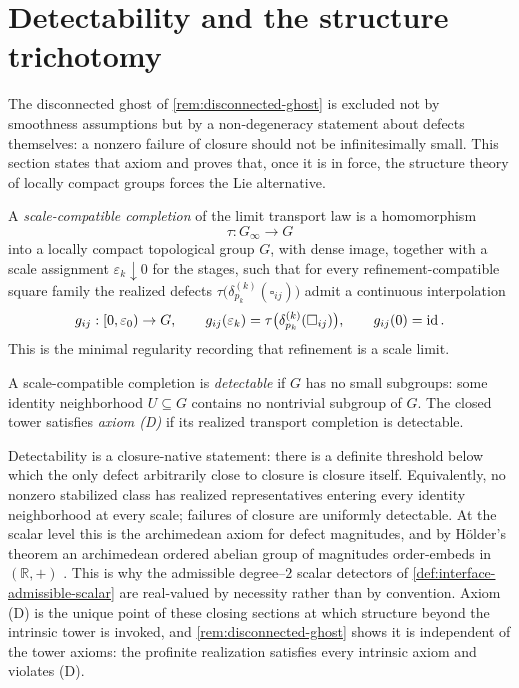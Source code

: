 \section{Detectability and the structure trichotomy}
\label{sec:interface-detectability}
The disconnected ghost of \cref{rem:disconnected-ghost} is excluded not
by smoothness assumptions but by a non-degeneracy statement about
defects themselves: a nonzero failure of closure should not be
infinitesimally small.  This section states that axiom and proves that,
once it is in force, the structure theory of locally compact groups
forces the Lie alternative.
\begin{definition}
	\label{def:scale-completion}
	A \emph{scale-compatible completion} of the limit transport law is a
	homomorphism
	\[
		\tau:G_\infty\to G
	\]
	into a locally compact topological group \(G\), with dense image,
	together with a scale assignment \(\varepsilon_k\downarrow 0\) for
	the stages, such that for every refinement-compatible square family
	the realized defects
	\(\tau\bigl(\delta_{p_k}^{(k)}(\square_{ij})\bigr)\) admit a
	continuous interpolation
	\[
		g_{ij}:[0,\varepsilon_0)\to G,
		\qquad
		g_{ij}(\varepsilon_k)=\tau\bigl(\delta_{p_k}^{(k)}(\square_{ij})\bigr),
		\qquad
		g_{ij}(0)=\operatorname{id} .
	\]
	This is the minimal regularity recording that refinement is a scale
	limit.
\end{definition}
\begin{definition}
	\label{def:axiom-D}
	A scale-compatible completion is \emph{detectable} if \(G\) has no
	small subgroups: some identity neighborhood \(U\subseteq G\) contains
	no nontrivial subgroup of \(G\).  The closed tower satisfies
	\emph{axiom \textup{(D)}} if its realized transport completion is
	detectable.
\end{definition}
\begin{remark}
	\label{rem:axiom-D-intrinsic}
	Detectability is a closure-native statement: there is a definite
	threshold below which the only defect arbitrarily close to closure is
	closure itself.  Equivalently, no nonzero stabilized class has
	realized representatives entering every identity neighborhood at
	every scale; failures of closure are uniformly detectable.  At the
	scalar level this is the archimedean axiom for defect magnitudes, and
	by H\"older's theorem an archimedean ordered abelian group of
	magnitudes order-embeds in \((\mathbb R,+)\) \cite{Holder1901}.  This is why the
	admissible degree--\(2\) scalar detectors of
	\cref{def:interface-admissible-scalar} are real-valued by necessity
	rather than by convention.  Axiom \textup{(D)} is the unique point of
	these closing sections at which structure beyond the intrinsic tower
	is invoked, and \cref{rem:disconnected-ghost} shows it is independent
	of the tower axioms: the profinite realization satisfies every
	intrinsic axiom and violates \textup{(D)}.
\end{remark}
